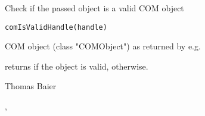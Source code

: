 \begin{Description}\relax
Check if the passed object is a valid COM object
\end{Description}
\begin{Usage}
\begin{verbatim}
comIsValidHandle(handle)
\end{verbatim}
\end{Usage}
\begin{Arguments}
\begin{ldescription}
\item[\code{handle}] COM object (class "COMObject") as returned by e.g.
\end{ldescription}
\end{Arguments}
\begin{Value}
 returns  if the object is valid, 
otherwise.
\end{Value}
\begin{Author}\relax
Thomas Baier
\end{Author}
\begin{SeeAlso}\relax
{}, 
\end{SeeAlso}

